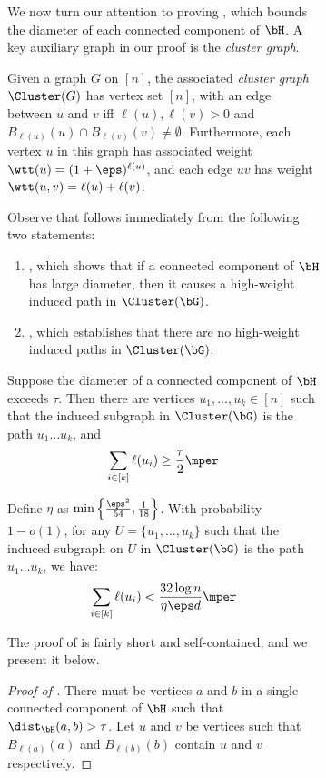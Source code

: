 \documentclass[11pt,letterpaper]{article}
\begin{document}
\begin{figure}
\begin{figure}
    We now turn our attention to proving , which bounds the diameter of each connected component of $\bH$.
    A key auxiliary graph in our proof is the \emph{cluster graph}.
    \begin{definition}\label{def:cluster-graph}
        Given a graph $G$ on $[n]$, the associated \emph{cluster graph} $\Cluster(G)$ has vertex set $[n]$, with an edge between $u$ and $v$ iff $\ell(u),\ell(v) > 0$ and $B_{\ell(u)}(u) \cap B_{\ell(v)}(v) \ne \emptyset$. 
        Furthermore, each vertex $u$ in this graph has associated weight $\wtt(u) = (1+\eps)^{\ell(u)}$, and each edge $uv$ has weight $\wtt(u, v) = \ell(u)+\ell(v)$.
    \end{definition}
    Observe that  follows immediately from the following two statements:
    \begin{enumerate}
        \item {}, which shows that if a connected component of $\bH$ has large diameter, then it causes a high-weight induced path in $\Cluster(\bG)$.
        \item {}, which establishes that there are no high-weight induced paths in $\Cluster(\bG)$.
    \end{enumerate}
    \begin{lemma}
    \label{lem:no-tree-excess-cluster-graph}
        Suppose the diameter of a connected component of $\bH$ exceeds $\tau$.
        Then there are vertices $u_1,\dots, u_k\in[n]$ such that the induced subgraph in $\Cluster(\bG)$ is the path $u_1\dots u_k$, and
        \[
            \sum_{i\in[k]} \ell(u_i) \ge \frac{\tau}{2}\mper
        \]
    \end{lemma}
    \begin{lemma}   \label{lem:no-long-path-cluster}
        Define $\eta$ as $\min\left\{\frac{\eps^2}{54}, \frac{1}{18}\right\}$.
        With probability $1-o(1)$, for any $U = \{u_1,\dots,u_k\}$ such that the induced subgraph on $U$ in $\Cluster(\bG)$ is the path $u_1\dots u_k$, we have:
        \[
            \sum_{i\in[k]} \ell(u_i) < \frac{32\log n}{\eta\eps d}\mper
        \]
    \end{lemma}

    The proof of  is fairly short and self-contained, and we present it below.
    \begin{proof}[Proof of ]
        There must be vertices $a$ and $b$ in a single connected component of $\bH$ such that $\dist_{\bH}(a,b) > \tau$.
        Let $u$ and $v$ be vertices such that $B_{\ell(a)}(a)$ and $B_{\ell(b)}(b)$ contain $u$ and $v$ respectively.


\end{proof}
\end{figure}
\end{figure}
\end{document}
